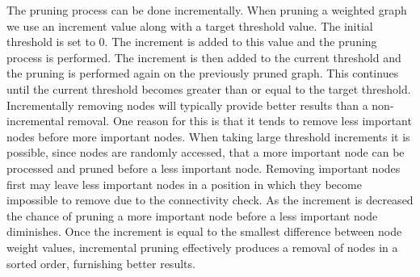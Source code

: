 The pruning process can be done incrementally. When pruning a weighted graph we use an increment value along with a target threshold value.  The initial threshold is set to 0. The increment is added to this value and the pruning process is performed. The increment is then added to the current threshold and the pruning is performed again on the previously pruned graph. This continues until the current threshold becomes greater than or equal to the target threshold.  Incrementally removing nodes will typically provide better results than a non-incremental removal.  One reason for this is that it tends to remove less important nodes before more important nodes.  When taking large threshold increments it is possible, since nodes are randomly accessed, that a more important node can be processed and pruned before a less important node.  Removing important nodes first may leave less important nodes in a position in which they become impossible to remove due to the connectivity check.  As the increment is decreased the chance of pruning a more important node before a less important node diminishes. Once the increment is equal to the smallest difference between node weight values, incremental pruning effectively produces a removal of nodes in a sorted order, furnishing better results.



